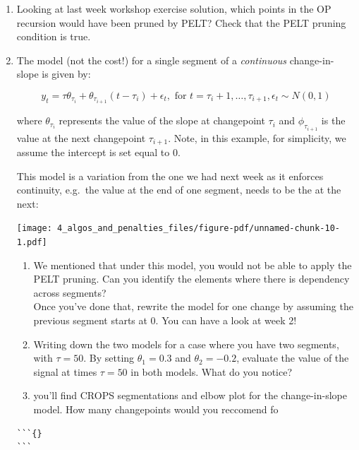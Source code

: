 \documentclass[
  letterpaper,
  DIV=11,
  numbers=noendperiod]{scrreprt}
\begin{document}
\begin{enumerate}
\def\labelenumi{\arabic{enumi}.}
\item
  Looking at last week workshop exercise solution, which points in the
  OP recursion would have been pruned by PELT? Check that the PELT
  pruning condition is true.
\item
  The model (not the cost!) for a single segment of a \emph{continuous}
  change-in-slope is given by:

  \[
  y_t = \tau\theta_{\tau_i} + \theta_{\tau_{i+1}} (t - \tau_i) + \epsilon_t, \text{ for } t = \tau_i + 1, \dots, \tau_{i+1}, \epsilon_t \sim N(0, 1)
  \]

  where \(\theta_{\tau_i}\) represents the value of the slope at
  changepoint \(\tau_i\) and \(\phi_{\tau_{i+1}}\) is the value at the
  next changepoint \(\tau_{i+1}\). Note, in this example, for
  simplicity, we assume the intercept is set equal to 0.

  This model is a variation from the one we had next week as it enforces
  continuity, e.g.~the value at the end of one segment, needs to be the
  at the next:

  \texttt{[image: 4\_algos\_and\_penalties\_files/figure-pdf/unnamed-chunk-10-1.pdf]}

  \begin{enumerate}
  \def\labelenumii{\alph{enumii}.}
  \item
    We mentioned that under this model, you would not be able to apply
    the PELT pruning. Can you identify the elements where there is
    dependency across segments?\\
    Once you've done that, rewrite the model for one change by assuming
    the previous segment starts at 0. You can have a look at week 2!
  \item
    Writing down the two models for a case where you have two segments,
    with \(\tau= 50\). By setting \(\theta_1=0.3\) and
    \(\theta_2=-0.2\), evaluate the value of the signal at times
    \(\tau= 50\) in both models. What do you notice?
  \item
    you'll find CROPS segmentations and elbow plot for the
    change-in-slope model. How many changepoints would you reccomend fo
  \end{enumerate}

\begin{verbatim}
```{}
```
\end{verbatim}
\end{enumerate}
\end{document}
